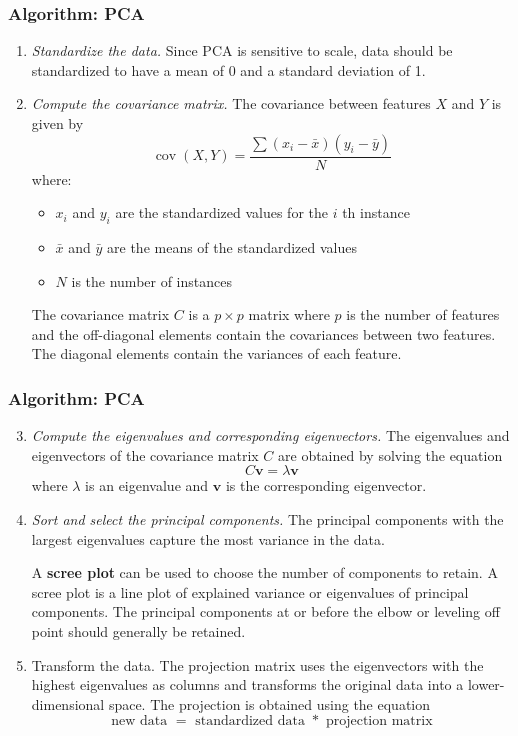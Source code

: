 \documentclass[8pt,dvipsnames]{beamer}
\begin{document}
\begin{frame}
    \frametitle{Algorithm: PCA}
    \begin{enumerate}
        \item \textit{Standardize the data.} Since PCA is sensitive to scale, data should be standardized to have a mean of 0 and a standard deviation of 1.
        \item \textit{Compute the covariance matrix.} The covariance between features \(X\) and \(Y\) is given by
              $$
                  \operatorname{cov}(X, Y)=\frac{\sum\left(x_{i}-\bar{x}\right)\left(y_{i}-\bar{y}\right)}{N}
              $$
              where:
              \begin{itemize}
                  \item \(x_{i}\) and \(y_{i}\) are the standardized values for the \(i\) th instance
                  \item \(\bar{x}\) and \(\bar{y}\) are the means of the standardized values
                  \item \(N\) is the number of instances
              \end{itemize}
              The covariance matrix \(C\) is a \(p \times p\) matrix where \(p\) is the number of features and the off-diagonal elements contain the covariances between two features. The diagonal elements contain the variances of each feature.
    \end{enumerate}
\end{frame}

\begin{frame}
    \frametitle{Algorithm: PCA}
    \begin{enumerate}
        \setcounter{enumi}{2}
        \item \textit{Compute the eigenvalues and corresponding eigenvectors.} The eigenvalues and eigenvectors of the covariance matrix \(C\) are
              obtained by solving the equation
              $$
                  C \mathbf{v}=\lambda \mathbf{v}
              $$
              where \(\lambda\) is an eigenvalue and \(\mathbf{v}\) is the corresponding eigenvector.
        \item \textit{Sort and select the principal components.} The principal components with the largest eigenvalues capture the most variance in the data.

              A \textbf{scree plot} can be used to choose the number of components to retain. A scree plot is a line plot of explained variance or eigenvalues of principal components. The principal components at or before the elbow or leveling off point should generally be retained.
        \item Transform the data. The projection matrix uses the eigenvectors with the highest eigenvalues as columns and transforms the original data into a lower-dimensional space. The projection is obtained using the equation
              $$
                  \text { new data }=\text { standardized data } * \text { projection matrix }
              $$
    \end{enumerate}
\end{frame}
\end{document}

